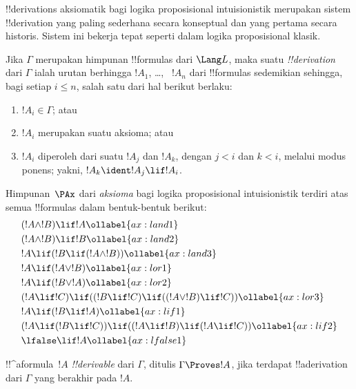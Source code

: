 \documentclass[../../../include/open-logic-section]{subfiles}
\begin{document}


!!{derivation}s aksiomatik bagi logika proposisional intuisionistik merupakan
sistem !!{derivation} yang paling sederhana secara konseptual dan yang pertama
secara historis. Sistem ini bekerja tepat seperti dalam logika proposisional
klasik.

\begin{defn}[!!^{derivability}]
Jika $\Gamma$ merupakan himpunan !!{formula}s dari $\Lang L$, maka suatu
\emph{!!{derivation}} dari $\Gamma$ ialah urutan berhingga $!A_1$, \dots,
~$!A_n$ dari !!{formula}s sedemikian sehingga, bagi setiap $i \le n$, salah
satu dari hal berikut berlaku:
\begin{enumerate}
\item $!A_i \in \Gamma$; atau
\item $!A_i$ merupakan suatu aksioma; atau
\item $!A_i$ diperoleh dari suatu $!A_j$ dan $!A_k$, dengan $j < i$ dan $k <
  i$, melalui modus ponens; yakni, $!A_k \ident !A_j \lif !A_i$.
\end{enumerate}
\end{defn}

\begin{defn}[Aksioma]
Himpunan~$\PAx$ dari \emph{aksioma} bagi logika proposisional intuisionistik
terdiri atas semua !!{formula}s dalam bentuk-bentuk berikut:
\begin{align}
  & (!A \land !B) \lif !A \ollabel{ax:land1}\\
  & (!A \land !B) \lif !B \ollabel{ax:land2}\\
  & !A \lif (!B \lif (!A \land !B)) \ollabel{ax:land3}\\
  & !A \lif (!A \lor !B) \ollabel{ax:lor1}\\
  & !A \lif (!B \lor !A) \ollabel{ax:lor2}\\
  & (!A \lif !C) \lif ((!B \lif !C) \lif ((!A \lor !B) \lif !C)) \ollabel{ax:lor3}\\
  & !A \lif (!B \lif !A) \ollabel{ax:lif1}\\
  & (!A \lif (!B \lif !C)) \lif ((!A \lif !B) \lif (!A \lif !C)) \ollabel{ax:lif2}\\
  & \lfalse \lif !A \ollabel{ax:lfalse1}
\end{align}
\end{defn}

\begin{defn}[!!^{derivability}]
!!^a{formula}~$!A$ \emph{!!{derivable}} dari $\Gamma$, ditulis $\Gamma
\Proves !A$, jika terdapat !!a{derivation} dari $\Gamma$ yang berakhir pada
$!A$.
\end{defn}
\end{document}
